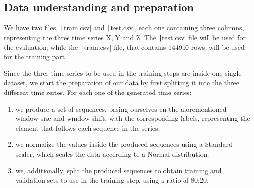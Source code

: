 \documentclass[12pt,a4paper,leqno]{article}
\begin{document}
	\subsection{Data understanding and preparation}
	We have two files, \texttt|train.csv| and \texttt|test.csv|, each one containing three columns, representing the three time series X, Y and Z. The \texttt|test.csv| file will be used for the evaluation, while the \texttt|train.csv| file, that contains 144910 rows, will be used for the training part.
	
	Since the three time series to be used in the training steps are inside one single dataset, we start the preparation of our data by first splitting it into the three different time series. For each one of the generated time series:
	\begin{enumerate}
		\item we produce a set of sequences, basing ourselves on the aforementioned window size and window shift, with the corresponding labels, representing the element that follows each sequence in the series;
		\item we normalize the values inside the produced sequences using a Standard scaler, which scales the data according to a Normal distribution;
		\item we, additionally, split the produced sequences to obtain training and validation sets to use in the training step, using a ratio of 80:20.
	\end{enumerate}
\end{document}
